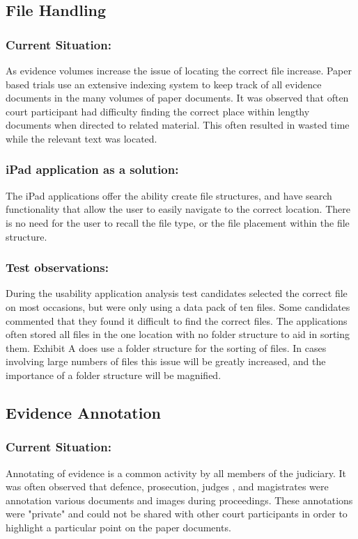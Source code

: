 \subsection{File Handling}
\subsubsection{Current Situation:}
As evidence volumes increase the issue of locating the correct file increase. Paper based trials use an extensive indexing system to keep track of all evidence documents in the many volumes of paper documents. It was observed that often court participant had difficulty finding the correct place within lengthy documents when directed to related material. This often resulted in wasted time while the relevant text was located.

\subsubsection{iPad application as a solution:}
The iPad applications offer the ability create file structures, and have search functionality that allow the user to easily navigate to the correct location. There is no need for the user to recall the file type, or the file placement within the file structure.

\subsubsection{Test observations:}
During the usability application analysis test candidates selected the correct file on most occasions, but were only using a data pack of ten files. Some candidates commented that they found it difficult to find the correct files. The applications often stored all files in the one location with no folder structure to aid in sorting them. Exhibit A does use a folder structure for the sorting of files. In cases involving large numbers of files this issue will be greatly increased, and the importance of a folder structure will be magnified.


\subsection{Evidence Annotation}
\subsubsection{Current Situation:}
Annotating of evidence is a common activity by all members of the judiciary. It was often observed that defence, prosecution, judges , and magistrates were annotation various documents and images during proceedings. These annotations were "private" and could not be shared with other court participants in order to highlight a particular point on the paper documents.

